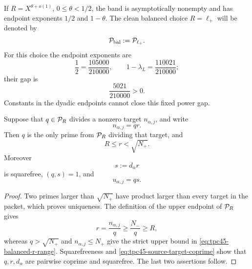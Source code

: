 If \(R=X^{\theta+o(1)}\), \(0\le\theta<1/2\), the band is
asymptotically nonempty and has endpoint exponents \(1/2\) and
\(1-\theta\).  The clean balanced choice \(R=\ell_+\) will be denoted by
\begin{equation}
 \mathcal P_{\rm bal}:=\mathcal P_{\ell_+}.
 \label{eq:tpc45-balanced-band}
\end{equation}
For this choice the endpoint exponents are
\begin{equation}
 \frac12=\frac{105000}{210000},
 \qquad
 1-\lambda_L=\frac{110021}{210000};
 \label{eq:tpc45-band-endpoint-exponents}
\end{equation}
their gap is
\begin{equation}
 \frac{5021}{210000}>0.
 \label{eq:tpc45-band-width-exponent}
\end{equation}
Constants in the dyadic endpoints cannot close this fixed power gap.

\begin{lemma}
\label{lem:tpc45-unique-balanced-cofactor}
Suppose that \(q\in\mathcal P_R\) divides a nonzero target
\(n_{\alpha,j}\), and write
\begin{equation}
 n_{\alpha,j}=qr.
 \label{eq:tpc45-target-q-r}
\end{equation}
Then \(q\) is the only prime from \(\mathcal P_R\) dividing that
target, and
\begin{equation}
 R\le r<\sqrt{N_+}.
 \label{eq:tpc45-balanced-r-range}
\end{equation}
Moreover
\begin{equation}
 s:=d_\alpha r
 \label{eq:tpc45-residual-label}
\end{equation}
is squarefree, \((q,s)=1\), and
\begin{equation}
 u_{\alpha,j}=qs.
 \label{eq:tpc45-u-q-s}
\end{equation}
\end{lemma}

\begin{proof}
Two primes larger than \(\sqrt{N_+}\) have product larger than every
target in the packet, which proves uniqueness.  The definition of the
upper endpoint of \(\mathcal P_R\) gives
\[
 r=\frac{n_{\alpha,j}}q
 \ge \frac{N_-}{q}\ge R,
\]
whereas \(q>\sqrt{N_+}\) and \(n_{\alpha,j}\le N_+\) give the strict
upper bound in \eqref{eq:tpc45-balanced-r-range}.  Squarefreeness and
\eqref{eq:tpc45-source-target-coprime} show that \(q,r,d_\alpha\)
are pairwise coprime and squarefree.  The last two assertions follow.
\end{proof}

